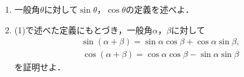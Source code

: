 \documentclass[../../main.tex]{subfiles}
\begin{document}
\begin{enumerate}
  \item 一般角$\theta$に対して$\sin\theta$，$\cos\theta$の定義を述べよ．
  \item (1)で述べた定義にもとづき，一般角$\alpha$，$\beta$に対して
    \begin{align*}
      \sin (\alpha+\beta) = \sin\alpha\cos\beta+\cos\alpha\sin\beta ,
    \end{align*}
    \begin{align*}
      \cos (\alpha+\beta) = \cos\alpha\cos\beta-\sin\alpha\sin\beta
    \end{align*}
    を証明せよ．
\end{enumerate}
\end{document}
